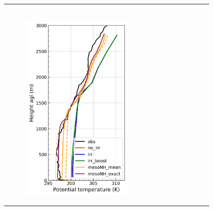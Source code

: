 \begin{figure}[hbtp]
{\begin{tabular}{@{}cccc@{}}
\begin{subfigure}[t]{0.29\textwidth}
        \end{subfigure} \\
        \begin{subfigure}[t]{0.382\textwidth}
            \caption{}
            \includegraphics[width=\textwidth]{images/chap5/profiles/profile_elsplans_theta_1507_sensbins.png}
        \end{subfigure} &
        \begin{subfigure}[t]{0.29\textwidth}
            \caption{}

\end{subfigure}
\end{tabular}}
\end{figure}
